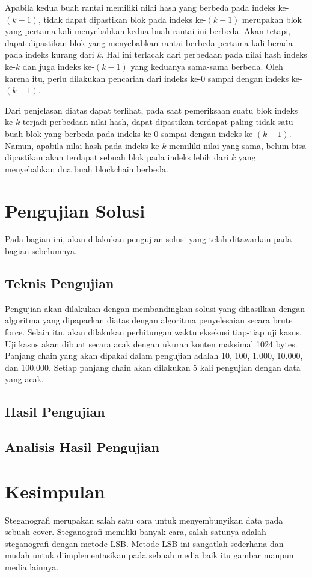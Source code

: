 \documentclass[10pt,conference]{IEEEtran}
\theoremstyle{definition}
\begin{document}
Apabila kedua buah rantai memiliki nilai hash yang berbeda pada indeks ke-$(k-1)$, tidak dapat dipastikan blok pada indeks ke-$(k-1)$ merupakan blok yang pertama kali menyebabkan kedua buah rantai ini berbeda. Akan tetapi, dapat dipastikan blok yang menyebabkan rantai berbeda pertama kali berada pada indeks kurang dari $k$. Hal ini terlacak dari perbedaan pada nilai hash indeks ke-$k$ dan juga indeks ke-$(k-1)$ yang keduanya sama-sama berbeda. Oleh karena itu, perlu dilakukan pencarian dari indeks ke-$0$ sampai dengan indeks ke-$(k-1)$.

Dari penjelasan diatas dapat terlihat, pada saat pemeriksaan suatu blok indeks ke-$k$ terjadi perbedaan nilai hash, dapat dipastikan terdapat paling tidak satu buah blok yang berbeda pada indeks ke-0 sampai dengan indeks ke-$(k-1)$. Namun, apabila nilai hash pada indeks ke-$k$ memiliki nilai yang sama, belum bisa dipastikan akan terdapat sebuah blok pada indeks lebih dari $k$ yang menyebabkan dua buah blockchain berbeda.

\section{Pengujian Solusi}
Pada bagian ini, akan dilakukan pengujian solusi yang telah ditawarkan pada bagian sebelumnya. 

\subsection{Teknis Pengujian}
Pengujian akan dilakukan dengan membandingkan solusi yang dihasilkan dengan algoritma yang dipaparkan diatas dengan algoritma penyelesaian secara brute force. Selain itu, akan dilakukan perhitungan waktu eksekusi tiap-tiap uji kasus. Uji kasus akan dibuat secara acak dengan ukuran konten maksimal 1024 bytes. Panjang chain yang akan dipakai dalam pengujian adalah 10, 100, 1.000, 10.000, dan 100.000. Setiap panjang chain akan dilakukan 5 kali pengujian dengan data yang acak.

\subsection{Hasil Pengujian}

\subsection{Analisis Hasil Pengujian}


\section{Kesimpulan}
Steganografi merupakan salah satu cara untuk menyembunyikan data pada sebuah cover. Steganografi memiliki banyak cara, salah satunya adalah steganografi dengan metode LSB. Metode LSB ini sangatlah sederhana dan mudah
untuk diimplementasikan pada sebuah media baik itu gambar maupun media lainnya. 
\end{document}
